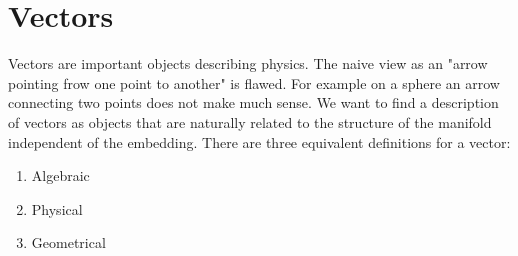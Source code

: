 \section{Vectors}
Vectors are important objects describing physics. The naive view as an "arrow pointing frow one point to another" is flawed. 
For example on a sphere an arrow connecting two points does not make much sense.
We want to find a description of vectors as objects that are naturally related to the structure of the manifold independent of the embedding.
There are three equivalent definitions for a vector:
\begin{enumerate}
    \item Algebraic 
    \item Physical
    \item Geometrical 
\end{enumerate}
